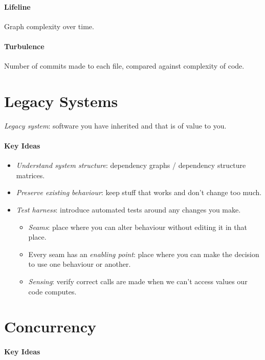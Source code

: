 \documentclass[twocolumn,english]{article}
\begin{document}
\paragraph{Lifeline}

Graph complexity over time.

\paragraph{Turbulence}

Number of commits made to each file, compared against complexity of
code.

\section{Legacy Systems}

\emph{Legacy system}: software you have inherited and that is of value
to you.

\paragraph{Key Ideas}
\begin{itemize}
\item \emph{Understand system structure}: dependency graphs / dependency
structure matrices.
\item \emph{Preserve existing behaviour}: keep stuff that works and don't
change too much.
\item \emph{Test harness}: introduce automated tests around any changes
you make.
\begin{itemize}
\item \emph{Seams}: place where you can alter behaviour without editing
it in that place.
\item Every seam has an \emph{enabling point}: place where you can make
the decision to use one behaviour or another.
\item \emph{Sensing}: verify correct calls are made when we can't access
values our code computes.
\end{itemize}
\end{itemize}

\section{Concurrency}

\paragraph{Key Ideas}
\end{document}
